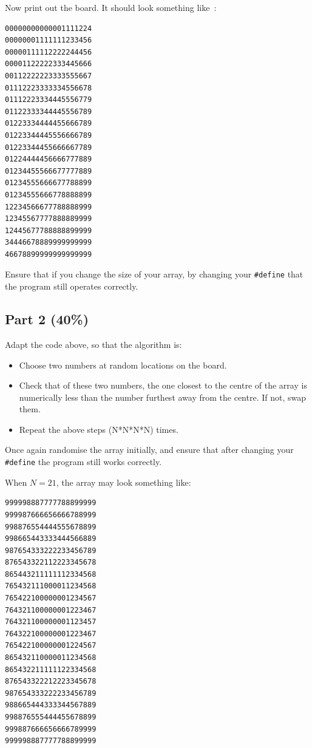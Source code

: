\begin{appendices}
Now print out the board. It should look something like~:
{\small
\begin{verbatim}
00000000000001111224
00000001111111233456
00000111112222244456
00001122222333445666
00112222223333555667
01112223333334556678
01112223334445556779
01122333344445556789
01223334444455666789
01223344445556666789
01223344455666667789
01224444456666777889
01234455566677777889
01234555666677788899
01234555666778888899
12234566677788888999
12345567777888889999
12445677788888899999
34446678889999999999
46678899999999999999
\end{verbatim}
}

Ensure that if you change the size of your array, by changing your \verb^#define^
that the program still operates correctly.

\subsection*{Part 2 (40\%)}
Adapt the code above, so that the algorithm is:
\begin{itemize}
\item Choose two numbers at random locations on the board.
\item Check that of these two numbers, the one closest to the centre of the array
is numerically less than the number furthest away from the centre. If not, swap them.
\item Repeat the above steps (N*N*N*N) times.
\end{itemize}

Once again randomise the array initially, and ensure that after changing your \verb^#define^
the program still works correctly.

When $N=21$, the array may look something like:
{\samepage
{\small
\begin{verbatim}
999998887777788899999
999987666656666788999
998876554444555678899
998665443333444566889
987654333222233456789
876543322112223345678
865443211111112334568
765432111000011234568
765422100000001234567
764321100000001223467
764321100000001123457
764322100000001223467
765422100000001224567
865432110000011234568
865432211111122334568
876543322212223345678
987654333222233456789
988665444333344567889
998876555444455678899
999887666656666789999
999998887777788899999
\end{verbatim}
}
}

\end{appendices}



